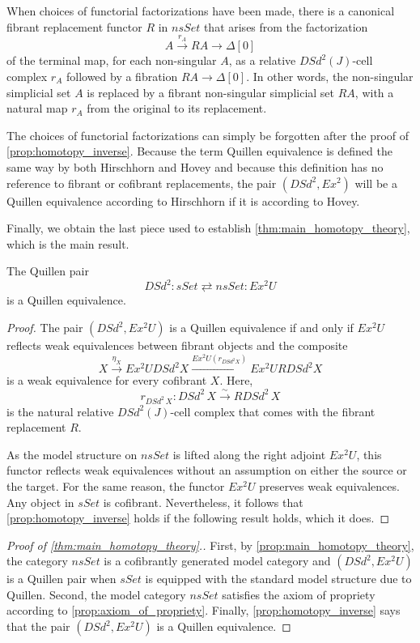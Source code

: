 When choices of functorial factorizations have been made, there is a canonical fibrant replacement functor $R$ in $nsSet$ that arises from the factorization
\[A\xrightarrow{r_A} RA\to \Delta [0]\]
of the terminal map, for each non-singular $A$, as a relative $DSd^2(J)$-cell complex $r_A$ followed by a fibration $RA\to \Delta [0]$. In other words, the non-singular simplicial set $A$ is replaced by a fibrant non-singular simplicial set $RA$, with a natural map $r_A$ from the original to its replacement.

The choices of functorial factorizations can simply be forgotten after the proof of \cref{prop:homotopy_inverse}. Because the term Quillen equivalence is defined the same way by both Hirschhorn and Hovey and because this definition has no reference to fibrant or cofibrant replacements, the pair $(DSd^2,Ex^2)$ will be a Quillen equivalence according to Hirschhorn if it is according to Hovey.

Finally, we obtain the last piece used to establish \cref{thm:main_homotopy_theory}, which is the main result.
\begin{proposition}\label{prop:homotopy_inverse}
The Quillen pair
\[DSd^2:sSet\rightleftarrows nsSet:Ex^2U\]
is a Quillen equivalence.
\end{proposition}
\begin{proof}
The pair $(DSd^2,Ex^2U)$ is a Quillen equivalence \cite[Cor.~1.3.16]{Ho99} if and only if $Ex^2U$ reflects weak equivalences between fibrant objects and the composite
\[X\xrightarrow{\eta _X} Ex^2UDSd^2X\xrightarrow{Ex^2U(r_{DSd^2X})} Ex^2URDSd^2X\]
is a weak equivalence for every cofibrant $X$. Here,
\[r_{DSd^2\, X}:DSd^2\, X\xrightarrow{\sim } RDSd^2\, X\]
is the natural relative $DSd^2(J)$-cell complex that comes with the fibrant replacement $R$.

As the model structure on $nsSet$ is lifted along the right adjoint $Ex^2U$, this functor  reflects weak equivalences without an assumption on either the source or the target. For the same reason, the functor $Ex^2U$ preserves weak equivalences. Any object in $sSet$ is cofibrant. Nevertheless, it follows that \cref{prop:homotopy_inverse} holds if the following result holds, which it does.
\end{proof}
\begin{proof}[Proof of \cref{thm:main_homotopy_theory}.]
First, by \cref{prop:main_homotopy_theory}, the category $nsSet$ is a cofibrantly generated model category and $(DSd^2,Ex^2U)$ is a Quillen pair when $sSet$ is equipped with the standard model structure due to Quillen. Second, the model category $nsSet$ satisfies the axiom of propriety according to \cref{prop:axiom_of_propriety}. Finally, \cref{prop:homotopy_inverse} says that the pair $(DSd^2,Ex^2U)$ is a Quillen equivalence.
\end{proof}




